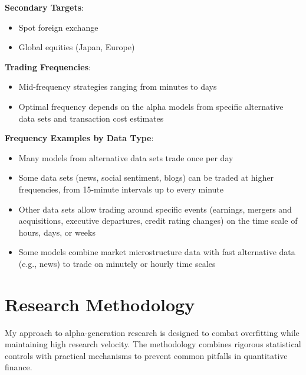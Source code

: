 \documentclass[11pt, letterpaper]{article}
\begin{document}
  \textbf{Secondary Targets}:

  \begin{itemize}
    \item Spot foreign exchange

    \item Global equities (Japan, Europe)
  \end{itemize}

  \textbf{Trading Frequencies}:

  \begin{itemize}
    \item Mid-frequency strategies ranging from minutes to days

    \item Optimal frequency depends on the alpha models from specific alternative
      data sets and transaction cost estimates
  \end{itemize}

  \textbf{Frequency Examples by Data Type}:

  \begin{itemize}
    \item Many models from alternative data sets trade once per day

    \item Some data sets (news, social sentiment, blogs) can be traded at
      higher frequencies, from 15-minute intervals up to every minute

    \item Other data sets allow trading around specific events (earnings,
      mergers and acquisitions, executive departures, credit rating changes)
      on the time scale of hours, days, or weeks

    \item Some models combine market microstructure data with fast alternative
      data (e.g., news) to trade on minutely or hourly time scales
  \end{itemize}

  \section{Research Methodology}
  \label{research-methodology}

  My approach to alpha-generation research is designed to combat overfitting
  while maintaining high research velocity. The methodology combines
  rigorous statistical controls with practical mechanisms to prevent
  common pitfalls in quantitative finance.
\end{document}
